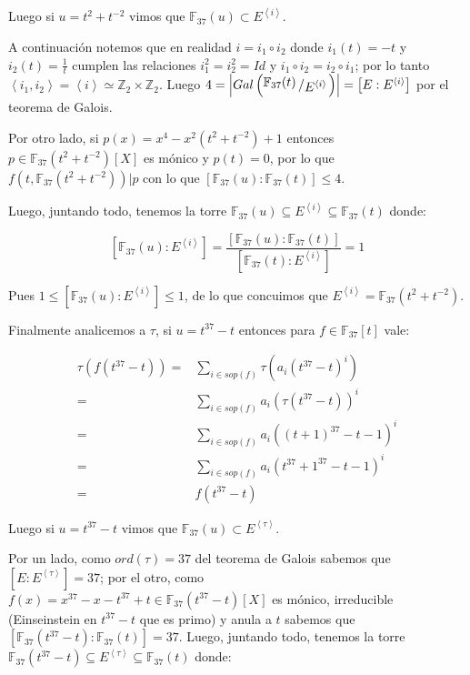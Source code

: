 \documentclass[11pt]{article}
\newcommand{\Z}{\mathbb{Z}}
\newcommand{\abs}[1]{\left\lvert#1\right\rvert}
\newcommand{\ip}[1]{\left\langle#1\right\rangle}
\newcommand{\quotient}[2]{{\raisebox{.2em}{$#1$}\left/\raisebox{-.2em}{$#2$}\right.}}
\numberwithin{theorem}{subsection}
\begin{document}
\begin{enumerate}
\begin{itemize}
	Luego si $u = t^{2} + t^{-2}$ vimos que $\mathbb{F}_{37}(u) \subset E^{\ip{i}}$. 
	
	A continuaci\'on notemos que en realidad $i = i_1 \circ i_2$ donde $i_1(t) = -t$ y $i_2(t) = \frac{1}{t}$ cumplen las relaciones $i_1^2 = i_2^2 = Id$ y $i_1 \circ i_2 = i_2 \circ i_1$; por lo tanto $\ip{i_1, i_2} = \ip{i} \simeq \Z_2 \times \Z_2$. Luego $4 = \abs{Gal \left(\quotient{\mathbb{F}_{37}(t)}{E^{\ip{i}}}\right)} = \left[E: E^{\ip{i}}\right]$ por el teorema de Galois.
	
	Por otro lado, si $p(x) = x^4 - x^2 \left(t^2 + t^{-2}\right) + 1$ entonces $p \in \mathbb{F}_{37}(t^2 + t^{-2})[X]$ es m\'onico y $p(t) = 0$, por lo que $f\left(t, \mathbb{F}_{37}(t^2 + t^{-2})\right) \vert p$ con lo que $\left[\mathbb{F}_{37}(u): \mathbb{F}_{37}(t)\right] \leq 4$.
	
	Luego, juntando todo, tenemos la torre $\mathbb{F}_{37}(u)  \subseteq E^{\ip{i}} \subseteq \mathbb{F}_{37}(t) $ donde:
	
	\begin{equation*}
	\left[\mathbb{F}_{37}(u): E^{\ip{i}}\right] = \dfrac{\left[\mathbb{F}_{37}(u): \mathbb{F}_{37}(t)\right]}{\left[\mathbb{F}_{37}(t): E^{\ip{i}}\right]} = 1
	\end{equation*}
	
	Pues $1 \leq \left[\mathbb{F}_{37}(u): E^{\ip{i}}\right] \leq 1$, de lo que concuimos que $E^{\ip{i}} = \mathbb{F}_{37}(t^{2} + t^{-2})$.
	
	Finalmente analicemos a $\tau$, si $u = t^{37} - t$ entonces para $f \in \mathbb{F}_{37}[t]$ vale:
	
	\begin{equation*}
	\begin{aligned}
	\tau\left(f(t^{37} - t)\right) = & \sum\limits_{i \in sop(f)}{\tau\left(a_i (t^{37} - t)^{i} \right)} \\
	= & \sum\limits_{i \in sop(f)} {a_i \left(\tau(t^{37} - t)\right)^i} \\
	= & \sum\limits_{i \in sop(f)} {a_i \left(\left(t + 1\right)^{37} - t - 1\right)^i} \\
	= & \sum\limits_{i \in sop(f)} {a_i \left(t^{37} + 1^{37} - t - 1\right)^i} \\
	=  & f(t^{37} - t)
	\end{aligned}
	\end{equation*}
	
	Luego si $u = t^{37} - t$ vimos que $\mathbb{F}_{37}(u) \subset E^{\ip{\tau}}$. 
	
	Por un lado, como $ord(\tau) = 37$ del teorema de Galois sabemos que $\left[E: E^{\ip{\tau}}\right] = 37$; por el otro, como $f(x) = x^{37} - x - t^{37} + t \in \mathbb{F}_{37}(t^{37} - t)[X]$ es m\'onico, irreducible (Einseinstein en $t^{37} - t$ que es primo) y anula a $t$ sabemos que $\left[\mathbb{F}_{37}(t^{37} - t): \mathbb{F}_{37}(t)\right] = 37$. Luego, juntando todo, tenemos la torre $\mathbb{F}_{37}(t^{37} - t)  \subseteq E^{\ip{\tau}} \subseteq \mathbb{F}_{37}(t) $ donde:
	

\end{itemize}
\end{enumerate}
\end{document}
